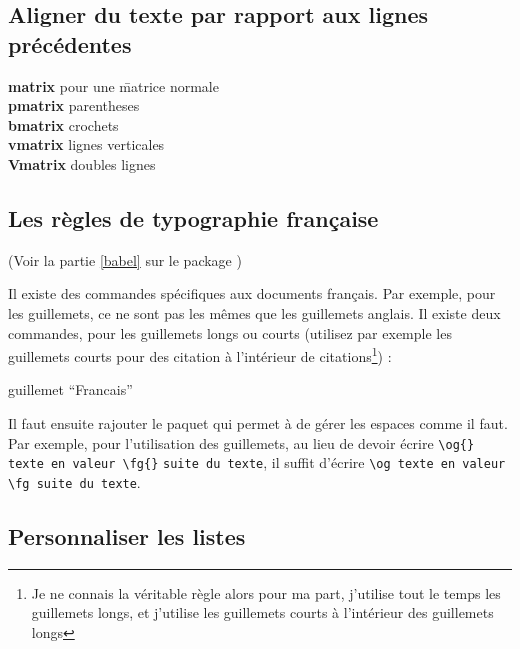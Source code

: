 \documentclass[a4paper,twoside]{article}
\begin{document}
\subsection{Aligner du texte par rapport aux lignes précédentes}
\begin{example}
\begin{tabbing}
\textbf{matrix} pour une \= matrice normale \\
\textbf{pmatrix} \> parentheses\\
\textbf{bmatrix} \> crochets\\
\textbf{vmatrix} \> lignes verticales\\
\textbf{Vmatrix} \> doubles lignes\\
\end{tabbing}

\end{example}

\subsection{Les règles de typographie française}

(Voir la partie \ref{babel} sur le package )

Il existe des commandes spécifiques aux documents français. Par exemple, pour les guillemets, ce ne sont pas les mêmes que les guillemets anglais. Il existe deux commandes, pour les guillemets longs ou courts (utilisez par exemple les guillemets courts pour des citation à l'intérieur de citations\footnote{Je ne connais la véritable règle alors pour ma part, j'utilise tout le temps les guillemets longs, et j'utilise les guillemets courts à l'intérieur des guillemets longs}) :
\begin{example}
\og guillemet ``Francais'' \fg
\end{example}

Il faut ensuite rajouter le paquet  qui permet à  de gérer les espaces comme il faut. Par exemple, pour l'utilisation des guillemets, au lieu de devoir écrire \verb|\og{} texte en valeur \fg{}| \verb|suite du texte|, il suffit d'écrire \verb|\og texte en valeur \fg suite du texte|.



\subsection{Personnaliser les listes}
\end{document}
